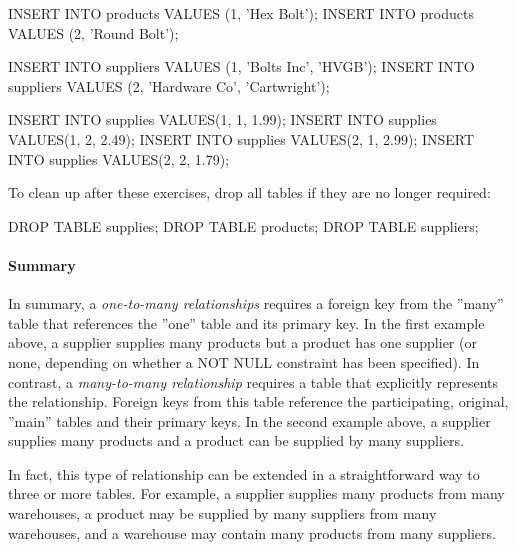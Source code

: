 \begin{samepage}
\begin{sqlcode}
INSERT INTO products VALUES (1, 'Hex Bolt');
INSERT INTO products VALUES (2, 'Round Bolt');

INSERT INTO suppliers VALUES (1, 'Bolts Inc', 'HVGB');
INSERT INTO suppliers VALUES (2, 'Hardware Co', 'Cartwright');

INSERT INTO supplies VALUES(1, 1, 1.99);
INSERT INTO supplies VALUES(1, 2, 2.49);
INSERT INTO supplies VALUES(2, 1, 2.99);
INSERT INTO supplies VALUES(2, 2, 1.79);
\end{sqlcode}
\end{samepage}

\noindent To clean up after these exercises, drop all tables if they are no longer required:

\begin{samepage}
\begin{sqlcode}
DROP TABLE supplies;
DROP TABLE products;
DROP TABLE suppliers;
\end{sqlcode}
\end{samepage}

\paragraph*{Summary} In summary, a \emph{one-to-many relationships} requires a foreign key from the ''many'' table that references the ''one'' table and its primary key. In the first example above, a supplier supplies many products but a product has one supplier (or none, depending on whether a NOT NULL constraint has been specified). In contrast, a \emph{many-to-many relationship} requires a table that explicitly represents the relationship. Foreign keys from this table reference the participating, original, ''main'' tables and their primary keys. In the second example above, a supplier supplies many products and a product can be supplied by many suppliers. 

In fact, this type of relationship can be extended in a straightforward way to three or more tables. For example, a supplier supplies many products from many warehouses, a product may be supplied by many suppliers from many warehouses, and a warehouse may contain many products from many suppliers. 

